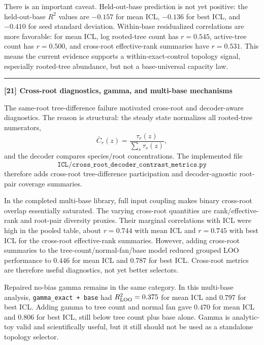\documentclass[11pt]{article}
\newcommand{\Cbar}{\bar C}
\begin{document}
\vspace{0.5em}
\noindent There is an important caveat. Held-out-base prediction is not yet positive: the held-out-base $R^2$ values are $-0.157$ for mean ICL, $-0.136$ for best ICL, and $-0.410$ for seed standard deviation. Within-base residualized correlations are more favorable: for mean ICL, log rooted-tree count has $r=0.545$, active-tree count has $r=0.500$, and cross-root effective-rank summaries have $r=0.531$. This means the current evidence supports a within-exact-control topology signal, especially rooted-tree abundance, but not a base-universal capacity law.

\vspace{1em}
\noindent\rule{\textwidth}{0.4pt}
\vspace{1em}

\noindent\textbf{[21] Cross-root diagnostics, gamma, and multi-base mechanisms}

\vspace{0.5em}
\noindent The same-root tree-difference failure motivated cross-root and decoder-aware diagnostics. The reason is structural: the steady state normalizes all rooted-tree numerators,
\[
\Cbar_r(z)=\frac{\tau_r(z)}{\sum_s\tau_s(z)},
\]
and the decoder compares species/root concentrations. The implemented file
\[
\texttt{ICL/cross\_root\_decoder\_contrast\_metrics.py}
\]
therefore adds cross-root tree-difference participation and decoder-agnostic root-pair coverage summaries.

\vspace{0.5em}
\noindent In the completed multi-base library, full input coupling makes binary cross-root overlap essentially saturated. The varying cross-root quantities are rank/effective-rank and root-pair diversity proxies. Their marginal correlations with ICL were high in the pooled table, about $r=0.744$ with mean ICL and $r=0.745$ with best ICL for the cross-root effective-rank summaries. However, adding cross-root summaries to the tree-count/normal-fan/base model reduced grouped LOO performance to $0.446$ for mean ICL and $0.787$ for best ICL. Cross-root metrics are therefore useful diagnostics, not yet better selectors.

\vspace{0.5em}
\noindent Repaired no-bias gamma remains in the same category. In this multi-base analysis, \texttt{gamma\_exact + base} had $R^2_{\rm LOO}=0.375$ for mean ICL and $0.797$ for best ICL. Adding gamma to tree count and normal fan gave $0.470$ for mean ICL and $0.806$ for best ICL, still below tree count plus base alone. Gamma is analytic-toy valid and scientifically useful, but it still should not be used as a standalone topology selector.
\end{document}
